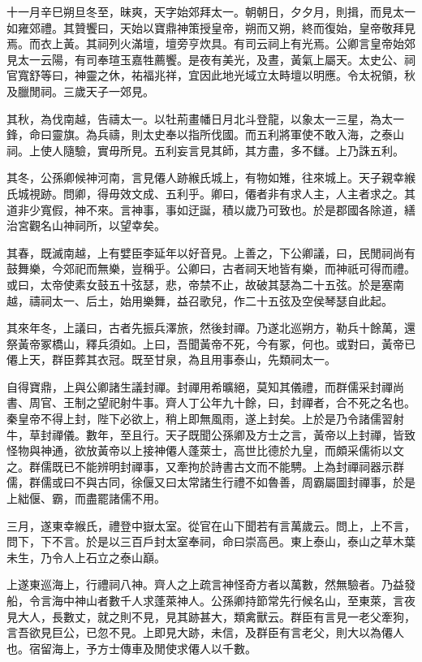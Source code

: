 十一月辛巳朔旦冬至，昧爽，天字始郊拜太一。朝朝日，夕夕月，則揖，而見太一如雍郊禮。其贊饗曰，天始以寶鼎神策授皇帝，朔而又朔，終而復始，皇帝敬拜見焉。而衣上黃。其祠列火滿壇，壇旁亨炊具。有司云祠上有光焉。公卿言皇帝始郊見太一云陽，有司奉瑄玉嘉牲薦饗。是夜有美光，及晝，黃氣上屬天。太史公、祠官寬舒等曰，神靈之休，祐福兆祥，宜因此地光域立太畤壇以明應。令太祝領，秋及臘閒祠。三歲天子一郊見。

其秋，為伐南越，告禱太一。以牡荊畫幡日月北斗登龍，以象太一三星，為太一鋒，命曰靈旗。為兵禱，則太史奉以指所伐國。而五利將軍使不敢入海，之泰山祠。上使人隨驗，實毋所見。五利妄言見其師，其方盡，多不讎。上乃誅五利。

其冬，公孫卿候神河南，言見僊人跡緱氏城上，有物如雉，往來城上。天子親幸緱氏城視跡。問卿，得毋效文成、五利乎。卿曰，僊者非有求人主，人主者求之。其道非少寬假，神不來。言神事，事如迂誕，積以歲乃可致也。於是郡國各除道，繕治宮觀名山神祠所，以望幸矣。

其春，既滅南越，上有嬖臣李延年以好音見。上善之，下公卿議，曰，民閒祠尚有鼓舞樂，今郊祀而無樂，豈稱乎。公卿曰，古者祠天地皆有樂，而神祇可得而禮。或曰，太帝使素女鼓五十弦瑟，悲，帝禁不止，故破其瑟為二十五弦。於是塞南越，禱祠太一、后土，始用樂舞，益召歌兒，作二十五弦及空侯琴瑟自此起。

其來年冬，上議曰，古者先振兵澤旅，然後封禪。乃遂北巡朔方，勒兵十餘萬，還祭黃帝冢橋山，釋兵須如。上曰，吾聞黃帝不死，今有冢，何也。或對曰，黃帝已僊上天，群臣葬其衣冠。既至甘泉，為且用事泰山，先類祠太一。

自得寶鼎，上與公卿諸生議封禪。封禪用希曠絕，莫知其儀禮，而群儒采封禪尚書、周官、王制之望祀射牛事。齊人丁公年九十餘，曰，封禪者，合不死之名也。秦皇帝不得上封，陛下必欲上，稍上即無風雨，遂上封矣。上於是乃令諸儒習射牛，草封禪儀。數年，至且行。天子既聞公孫卿及方士之言，黃帝以上封禪，皆致怪物與神通，欲放黃帝以上接神僊人蓬萊士，高世比德於九皇，而頗采儒術以文之。群儒既已不能辨明封禪事，又牽拘於詩書古文而不能騁。上為封禪祠器示群儒，群儒或曰不與古同，徐偃又曰太常諸生行禮不如魯善，周霸屬圖封禪事，於是上絀偃、霸，而盡罷諸儒不用。

三月，遂東幸緱氏，禮登中嶽太室。從官在山下聞若有言萬歲云。問上，上不言，問下，下不言。於是以三百戶封太室奉祠，命曰崇高邑。東上泰山，泰山之草木葉未生，乃令人上石立之泰山巔。

上遂東巡海上，行禮祠八神。齊人之上疏言神怪奇方者以萬數，然無驗者。乃益發船，令言海中神山者數千人求蓬萊神人。公孫卿持節常先行候名山，至東萊，言夜見大人，長數丈，就之則不見，見其跡甚大，類禽獸云。群臣有言見一老父牽狗，言吾欲見巨公，已忽不見。上即見大跡，未信，及群臣有言老父，則大以為僊人也。宿留海上，予方士傳車及閒使求僊人以千數。


